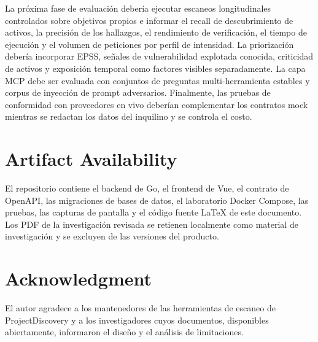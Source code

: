 \documentclass[conference,a4paper]{IEEEtran}
\begin{document}
La próxima fase de evaluación debería ejecutar escaneos longitudinales controlados sobre objetivos propios e informar el recall de descubrimiento de activos, la precisión de los hallazgos, el rendimiento de verificación, el tiempo de ejecución y el volumen de peticiones por perfil de intensidad. La priorización debería incorporar EPSS, señales de vulnerabilidad explotada conocida, criticidad de activos y exposición temporal como factores visibles separadamente. La capa MCP debe ser evaluada con conjuntos de preguntas multi-herramienta estables y corpus de inyección de prompt adversarios. Finalmente, las pruebas de conformidad con proveedores en vivo deberían complementar los contratos mock mientras se redactan los datos del inquilino y se controla el costo.

\section*{Artifact Availability}

El repositorio contiene el backend de Go, el frontend de Vue, el contrato de OpenAPI, las migraciones de bases de datos, el laboratorio Docker Compose, las pruebas, las capturas de pantalla y el código fuente LaTeX de este documento. Los PDF de la investigación revisada se retienen localmente como material de investigación y se excluyen de las versiones del producto.

\section*{Acknowledgment}

El autor agradece a los mantenedores de las herramientas de escaneo de ProjectDiscovery y a los investigadores cuyos documentos, disponibles abiertamente, informaron el diseño y el análisis de limitaciones.

\balance


\end{document}
